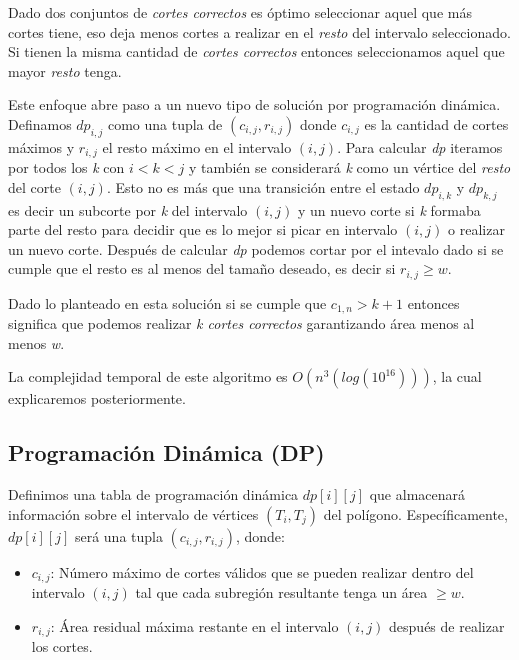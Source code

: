 \documentclass{article}
\begin{document}
Dado dos conjuntos de \emph{cortes correctos} es \'optimo seleccionar aquel que m\'as cortes tiene, eso deja menos cortes a realizar en el \emph{resto} del intervalo seleccionado. Si tienen la misma cantidad de \emph{cortes correctos} entonces seleccionamos aquel que mayor \emph{resto} tenga.


Este enfoque abre paso a un nuevo tipo de soluci\'on por programaci\'on din\'amica. Definamos $dp_{i,j}$ como una tupla de $(c_{i,j}, r_{i,j})$ donde $c_{i,j}$ es la cantidad de cortes m\'aximos y $r_{i,j}$ el resto m\'aximo en el intervalo $(i,j)$. Para calcular \emph{dp} iteramos por todos los \emph{k} con $i < k < j$ y tambi\'en se considerar\'a \emph{k} como un v\'ertice del \emph{resto} del corte $(i,j)$. Esto no es m\'as que una transici\'on entre el estado $dp_{i,k}$ y $dp_{k,j}$ es decir un subcorte por \emph{k} del intervalo $(i,j)$ y un nuevo corte si \emph{k} formaba parte del resto para decidir que es lo mejor si picar en intervalo $(i,j)$ o realizar un nuevo corte. Despu\'es de calcular \emph{dp} podemos cortar por el intevalo dado si se cumple que el resto es al menos del tama\~no deseado, es decir si $r_{i,j} \geq w$.

Dado lo planteado en esta soluci\'on si se cumple que $c_{1,n} > k+1$ entonces significa que podemos realizar \emph{k cortes correctos} garantizando \'area menos al menos \emph{w}. 

La complejidad temporal de este algoritmo es $O(n^3(log(10^{16})))$, la cual explicaremos posteriormente.


\subsection{Programación Dinámica (DP)}

Definimos una tabla de programación dinámica \( dp[i][j] \) que almacenará información sobre el intervalo de vértices \( (T_i, T_j) \) del polígono. Específicamente, \( dp[i][j] \) será una tupla \( (c_{i,j}, r_{i,j}) \), donde:

\begin{itemize}
    \item \( c_{i,j} \): Número máximo de cortes válidos que se pueden realizar dentro del intervalo \( (i, j) \) tal que cada subregión resultante tenga un área \(\geq w\).
    \item \( r_{i,j} \): Área residual máxima restante en el intervalo \( (i, j) \) después de realizar los cortes.
\end{itemize}
\end{document}

